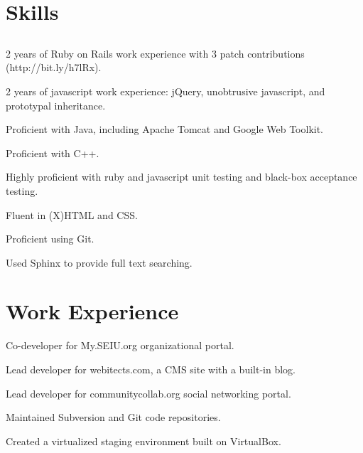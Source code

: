 \documentclass{resume}
\begin{document}
\author{Dmitry Ratnikov}
\maketitle

\section{Skills}

\subsection{}

\begin{compactitem}
  \item 2 years of Ruby on Rails work experience with 3 patch contributions (http://bit.ly/h7lRx).
  \item 2 years of javascript work experience: jQuery, unobtrusive javascript, and prototypal inheritance.
  \item Proficient with Java, including Apache Tomcat and Google Web Toolkit.
  \item Proficient with C++.
  \\
  \item Highly proficient with ruby and javascript unit testing and black-box acceptance testing.
  \item Fluent in (X)HTML and CSS.
  \item Proficient using Git.
  \item Used Sphinx to provide full text searching.
\end{compactitem}

\section{Work Experience}

\begin{compactitem}
  \item Co-developer for My.SEIU.org organizational portal.
  \item Lead developer for webitects.com, a CMS site with a built-in blog.
  \item Lead developer for communitycollab.org social networking portal.
  \item Maintained Subversion and Git code repositories.
  \item Created a virtualized staging environment built on VirtualBox.
\end{compactitem}
\end{document}
